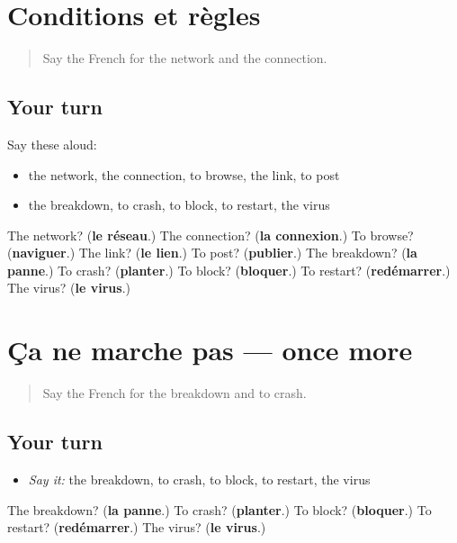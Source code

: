 \section[(dialogue)]{Conditions et règles}

\label{lesson:FR-R399-revision-398-399}



\begin{quote}
Say the French for the network and the connection.
\end{quote}

\subsection*{Your turn}
Say these aloud:

\begin{itemize}
\raggedright
  \item the network, the connection, to browse, the link, to post
  \item the breakdown, to crash, to block, to restart, the virus
\end{itemize}

\begin{tcolorbox}[breakable,colback=teal!4,colframe=teal!35!black,title={Before you move on}]
The network? (\textbf{le réseau}.) The connection? (\textbf{la connexion}.) To browse? (\textbf{naviguer}.) The link? (\textbf{le lien}.) To post? (\textbf{publier}.) The breakdown? (\textbf{la panne}.) To crash? (\textbf{planter}.) To block? (\textbf{bloquer}.) To restart? (\textbf{redémarrer}.) The virus? (\textbf{le virus}.)
\end{tcolorbox}
\section[(dialogue)]{Ça ne marche pas — once more}

\label{lesson:FR-R399-revision-final-399}



\begin{quote}
Say the French for the breakdown and to crash.
\end{quote}

\subsection*{Your turn}
\begin{itemize}
\raggedright
  \item \emph{Say it:} the breakdown, to crash, to block, to restart, the virus
\end{itemize}

\begin{tcolorbox}[breakable,colback=teal!4,colframe=teal!35!black,title={Before you move on}]
The breakdown? (\textbf{la panne}.) To crash? (\textbf{planter}.) To block? (\textbf{bloquer}.) To restart? (\textbf{redémarrer}.) The virus? (\textbf{le virus}.)
\end{tcolorbox}
